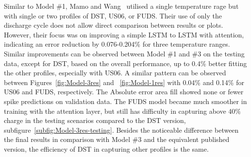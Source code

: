 %
%
Similar to Model \#1, Mamo and Wang~\cite{mamo_long_2020} utilised a single temperature rage but with single or two profiles of DST, US06, or FUDS.
Their use of only the discharge cycle does not allow direct comparison between results or plots.
However, their focus was on improving a simple LSTM to LSTM with attention, indicating an error reduction by 0.076-0.204\% for three temperature ranges.
Similar improvements can be observed between Model \#1 and \#3 on the testing data, except for DST, based on the overall performance, up to 0.4\% better fitting the other profiles, especially with US06.
A similar pattern can be observed between Figures~\ref{fig:Model-3res} and ~\ref{fig:Model-1res} with 0.04\% and 0.14\% for US06 and FUDS, respectively.
The Absolute error area fill showed none or fewer spike predictions on validation data.
The FUDS model became much smoother in training with the attention layer, but still has difficulty in capturing above 40\% charge in the testing scenarios compared to the DST version, subfigure~\ref{subfig:Model-3res-testing}. 
Besides the noticeable difference between the final results in comparison with Model \#3 and the equivalent published version, the efficiency of DST in capturing other profiles is the same.

